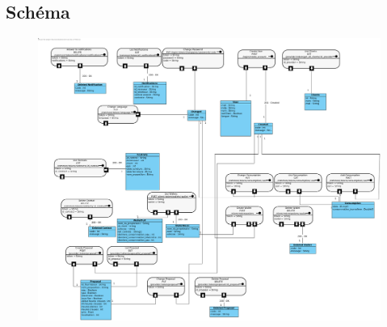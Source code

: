 \subsection{Schéma}
\begin{figure}[h]
\includegraphics[scale=0.2]{Base/apirest/img/apirest.png}
\end{figure}

